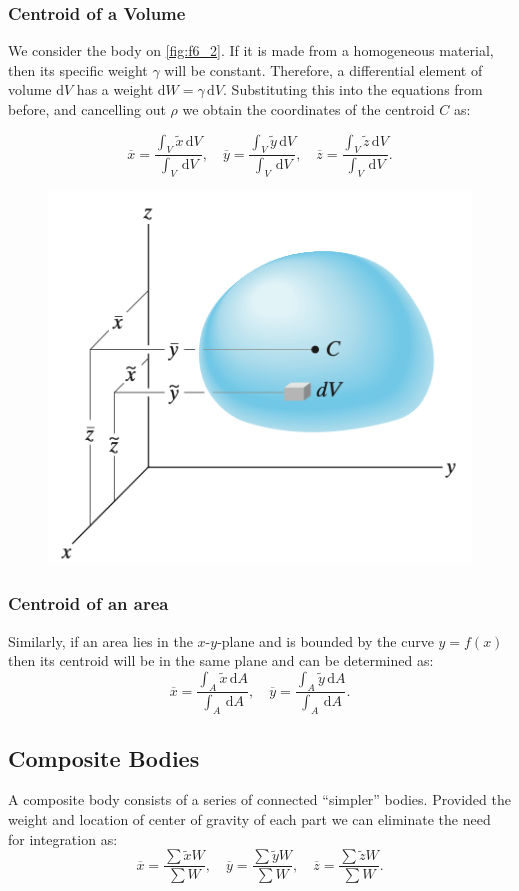 \subsubsection{Centroid of a Volume}
We consider the body on \autoref{fig:f6_2}. If it is made from a homogeneous material, then its specific weight $\gamma$ will be constant. Therefore, a differential element of volume $\mathrm{d}V$ has a weight $\mathrm{d}W = \gamma \, \mathrm{d}V$. Substituting this into the equations from before, and cancelling out $\rho$ we obtain the coordinates of the centroid $C$ as:

\[ 
  \overline{x} = \frac{\int_V \tilde{x} \, \mathrm{d}V}{\int_V \, \mathrm{d}V}, \quad \overline{y} = \frac{\int_V \tilde{y} \, \mathrm{d}V}{\int_V \, \mathrm{d}V}, \quad \overline{z} = \frac{\int_V \tilde{z} \, \mathrm{d}V}{\int_V \, \mathrm{d}V}
.\]

\begin{figure} [ht]
  \centering
  \includegraphics[width=0.5\linewidth]{./figures/f6_2.png}
  \caption{}
  \label{fig:f6_2}
\end{figure}


\subsubsection{Centroid of an area}
Similarly, if an area lies in the $x$-$y$-plane and is bounded by the curve $y = f(x)$ then its centroid will be in the same plane and can be determined as:
\[ 
  \overline{x} = \frac{\int_A \tilde{x} \, \mathrm{d}A}{\int_A \, \mathrm{d}A}, \quad \overline{y} = \frac{\int_A \tilde{y} \, \mathrm{d}A}{\int_A \, \mathrm{d}A}
.\]


\subsection{Composite Bodies}
A composite body consists of a series of connected ``simpler'' bodies. Provided the weight and location of center of gravity of each part we can eliminate the need for integration as:
\[ 
  \overline{x} = \frac{\sum \tilde{x} W}{\sum W}, \quad \overline{y} = \frac{\sum \tilde{y} W}{\sum W}, \quad \overline{z} = \frac{\sum \tilde{z} W}{\sum W}
.\]

